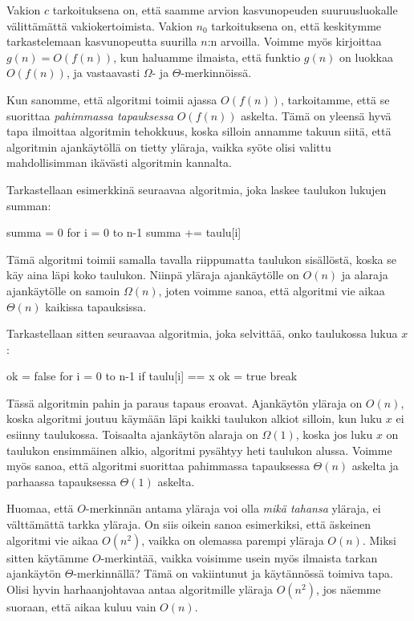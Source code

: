 Vakion $c$ tarkoituksena on, että saamme arvion kasvunopeuden suuruusluokalle välittämättä
vakiokertoimista. Vakion $n_0$ tarkoituksena on, että keskitymme tarkastelemaan
kasvunopeutta suurilla $n$:n arvoilla.
Voimme myös kirjoittaa $g(n)=O(f(n))$, kun haluamme ilmaista,
että funktio $g(n)$ on luokkaa $O(f(n))$,
ja vastaavasti $\Omega$- ja $\Theta$-merkinnöissä.

Kun sanomme, että algoritmi toimii ajassa $O(f(n))$, tarkoitamme, että se suorittaa
\emph{pahimmassa tapauksessa} $O(f(n))$ askelta.
Tämä on yleensä hyvä tapa ilmoittaa algoritmin tehokkuus,
koska silloin annamme takuun siitä, että algoritmin ajankäytöllä on tietty yläraja,
vaikka syöte olisi valittu mahdollisimman ikävästi algoritmin kannalta.

Tarkastellaan esimerkkinä seuraavaa algoritmia, joka laskee
taulukon lukujen summan:

\begin{code}
summa = 0
for i = 0 to n-1
    summa += taulu[i]
\end{code}

Tämä algoritmi toimii samalla tavalla riippumatta taulukon sisällöstä,
koska se käy aina läpi koko taulukon.
Niinpä yläraja ajankäytölle on $O(n)$ ja alaraja ajankäytölle on samoin $\Omega(n)$,
joten voimme sanoa, että algoritmi vie aikaa $\Theta(n)$ kaikissa tapauksissa.

Tarkastellaan sitten seuraavaa algoritmia, joka selvittää,
onko taulukossa lukua $x$:

\begin{code}
ok = false
for i = 0 to n-1
    if taulu[i] == x
        ok = true
        break
\end{code}

Tässä algoritmin pahin ja paraus tapaus eroavat.
Ajankäytön yläraja on $O(n)$, koska algoritmi joutuu käymään
läpi kaikki taulukon alkiot silloin, kun luku $x$
ei esiinny taulukossa.
Toisaalta ajankäytön alaraja on $\Omega(1)$,
koska jos luku $x$ on taulukon ensimmäinen alkio,
algoritmi pysähtyy heti taulukon alussa.
Voimme myös sanoa, että algoritmi suorittaa pahimmassa
tapauksessa $\Theta(n)$ askelta ja parhaassa tapauksessa
$\Theta(1)$ askelta.

Huomaa, että $O$-merkinnän antama yläraja voi olla
\emph{mikä tahansa} yläraja, ei välttämättä tarkka yläraja.
On siis oikein sanoa esimerkiksi, että äskeinen
algoritmi vie aikaa $O(n^2)$, vaikka on olemassa parempi yläraja $O(n)$.
Miksi sitten käytämme $O$-merkintää, vaikka voisimme usein myös ilmaista tarkan
ajankäytön $\Theta$-merkinnällä?
Tämä on vakiintunut ja käytännössä toimiva tapa.
Olisi hyvin harhaanjohtavaa antaa algoritmille yläraja $O(n^2)$,
jos näemme suoraan, että aikaa kuluu vain $O(n)$.

